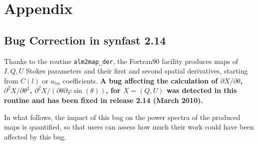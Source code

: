 \section[Appendix]{Appendix}
\label{fac:appendix}
\subsection{Bug Correction in synfast 2.14}
\label{fac:sec:bug_synder}
Thanks to the routine {\tt alm2map\_der}, the Fortran90 
facility  produces
maps of $I,Q,U$ Stokes parameters and their first and second spatial derivatives,
starting from $C(l)$ or $a_{lm}$ coefficients.
{\bf A bug affecting the calculation of $\partial X/\partial\theta$, 
$\partial^2 X/\partial \theta^2$, 
$\partial^2 X/(\partial\theta\partial\varphi\sin(\theta))$, for $X=(Q,U)$
was detected in this routine and has been fixed in release 2.14 (March 2010).}

In what follows, the impact of this bug on the power spectra of
the produced maps is quantified, so that users can
assess how much their work could have been affected by this bug.

